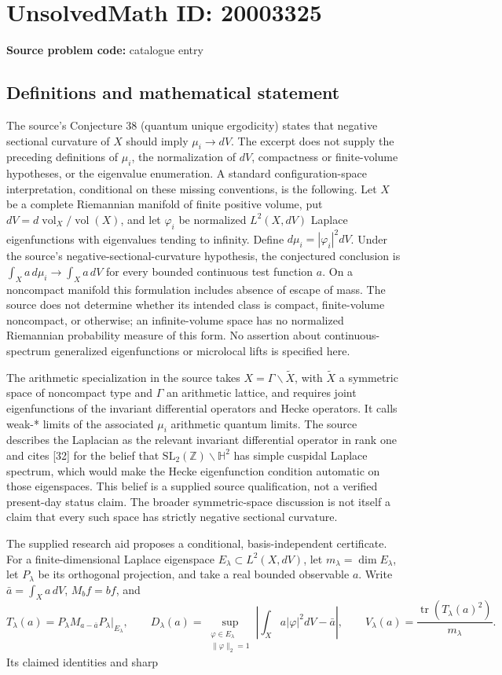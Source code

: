 \documentclass[11pt]{article}
\newcommand{\Z}{\mathbb{Z}}
\begin{document}
\section*{UnsolvedMath ID: 20003325}
\textbf{Source problem code:} catalogue entry
\subsection{Definitions and mathematical statement}
The source's Conjecture 38 (quantum unique ergodicity) states that negative sectional curvature of \(X\) should imply \(\mu_i\to dV\). The excerpt does not supply the preceding definitions of \(\mu_i\), the normalization of \(dV\), compactness or finite-volume hypotheses, or the eigenvalue enumeration. A standard configuration-space interpretation, conditional on these missing conventions, is the following. Let \(X\) be a complete Riemannian manifold of finite positive volume, put \(dV=d\operatorname{vol}_X/\operatorname{vol}(X)\), and let \(\varphi_i\) be normalized \(L^2(X,dV)\) Laplace eigenfunctions with eigenvalues tending to infinity. Define \(d\mu_i=|\varphi_i|^2dV\). Under the source's negative-sectional-curvature hypothesis, the conjectured conclusion is \(\int_X a\,d\mu_i\to\int_X a\,dV\) for every bounded continuous test function \(a\). On a noncompact manifold this formulation includes absence of escape of mass. The source does not determine whether its intended class is compact, finite-volume noncompact, or otherwise; an infinite-volume space has no normalized Riemannian probability measure of this form. No assertion about continuous-spectrum generalized eigenfunctions or microlocal lifts is specified here.\par The arithmetic specialization in the source takes \(X=\Gamma\backslash\widetilde X\), with \(\widetilde X\) a symmetric space of noncompact type and \(\Gamma\) an arithmetic lattice, and requires joint eigenfunctions of the invariant differential operators and Hecke operators. It calls weak-* limits of the associated \(\mu_i\) arithmetic quantum limits. The source describes the Laplacian as the relevant invariant differential operator in rank one and cites [32] for the belief that \(\mathrm{SL}_2(\Z)\backslash\mathbb H^2\) has simple cuspidal Laplace spectrum, which would make the Hecke eigenfunction condition automatic on those eigenspaces. This belief is a supplied source qualification, not a verified present-day status claim. The broader symmetric-space discussion is not itself a claim that every such space has strictly negative sectional curvature.\par The supplied research aid proposes a conditional, basis-independent certificate. For a finite-dimensional Laplace eigenspace \(E_\lambda\subset L^2(X,dV)\), let \(m_\lambda=\dim E_\lambda\), let \(P_\lambda\) be its orthogonal projection, and take a real bounded observable \(a\). Write \(\bar a=\int_X a\,dV\), \(M_b f=bf\), and\[T_\lambda(a)=P_\lambda M_{a-\bar a}P_\lambda\big|_{E_\lambda},\qquad D_\lambda(a)=\sup_{\substack{\varphi\in E_\lambda\\\|\varphi\|_2=1}}\left|\int_X a|\varphi|^2dV-\bar a\right|,\qquad V_\lambda(a)=\frac{\operatorname{tr}(T_\lambda(a)^2)}{m_\lambda}.\] Its claimed identities and sharp 
\end{document}
